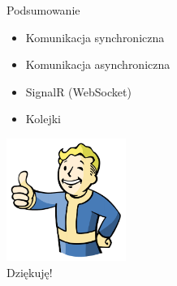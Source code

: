 \documentclass{beamer}
\begin{document}
\begin{frame}{Podsumowanie}
	\begin{huge}
		\begin{itemize}[<+->]
			\item Komunikacja synchroniczna
			\item Komunikacja asynchroniczna
			\item SignalR (WebSocket)
			\item Kolejki
		\end{itemize}
	\end{huge}
\end{frame}

\begin{frame}{}
	\begin{center}
  		\includegraphics[height=4cm]{ok.png} \\
		\Huge{Dziękuję!}
	\end{center}
\end{frame}
\end{document}
